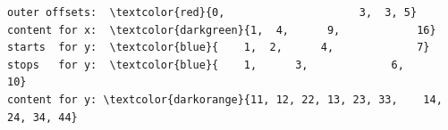 \documentclass[aspectratio=169]{beamer}
\begin{document}
\begin{frame}[fragile]{}
\begin{onlyenv}
\vspace{0.25 cm}
\begin{Verbatim}[commandchars=\\\{\}]
outer offsets:  \textcolor{red}{0,                     3,  3, 5}
content for x:  \textcolor{darkgreen}{1,  4,      9,            16}
starts  for y:  \textcolor{blue}{    1,  2,      4,             7}
stops   for y:  \textcolor{blue}{    1,      3,             6,            10}
content for y: \textcolor{darkorange}{11, 12, 22, 13, 23, 33,    14, 24, 34, 44}
\end{Verbatim}
\vspace{5 cm}
\end{onlyenv}

\end{frame}



\end{document}
